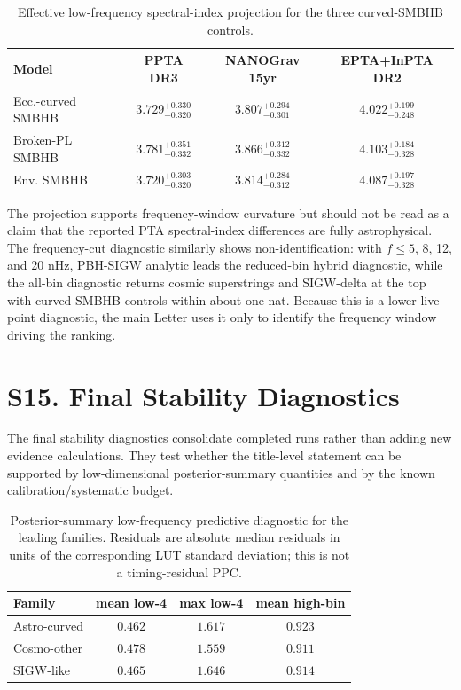 \documentclass[aps,prl,superscriptaddress,nofootinbib]{revtex4-2}
\begin{document}
\begin{table}[H]
\caption{\label{tab:gamma-bridge}Effective low-frequency spectral-index
projection for the three curved-SMBHB controls.}
\begin{ruledtabular}
\begin{tabular}{lccc}
Model & PPTA DR3 & NANOGrav 15yr & EPTA+InPTA DR2 \\
\hline
Ecc.-curved SMBHB & $3.729^{+0.330}_{-0.320}$ &
$3.807^{+0.294}_{-0.301}$ & $4.022^{+0.199}_{-0.248}$ \\
Broken-PL SMBHB & $3.781^{+0.351}_{-0.332}$ &
$3.866^{+0.312}_{-0.332}$ & $4.103^{+0.184}_{-0.328}$ \\
Env. SMBHB & $3.720^{+0.303}_{-0.320}$ &
$3.814^{+0.284}_{-0.312}$ & $4.087^{+0.197}_{-0.328}$ \\
\end{tabular}
\end{ruledtabular}
\end{table}

The projection supports frequency-window curvature but should not be read as a
claim that the reported PTA spectral-index differences are fully
astrophysical.  The frequency-cut diagnostic similarly shows
non-identification: with $f\le5$, 8, 12, and 20 nHz, PBH-SIGW analytic leads
the reduced-bin hybrid diagnostic, while the all-bin diagnostic returns cosmic
superstrings and SIGW-delta at the top with curved-SMBHB controls within
about one nat.  Because this is a lower-live-point diagnostic, the main Letter
uses it only to identify the frequency window driving the ranking.

\section*{S15. Final Stability Diagnostics}

The final stability diagnostics consolidate completed runs rather than adding
new evidence calculations.  They test whether the title-level statement can be
supported by low-dimensional posterior-summary quantities and by the known
calibration/systematic budget.

\begin{table}[H]
\caption{\label{tab:final-ppc}Posterior-summary low-frequency predictive
diagnostic for the leading families.  Residuals are absolute median residuals
in units of the corresponding LUT standard deviation; this is not a
timing-residual PPC.}
\begin{ruledtabular}
\begin{tabular}{lccc}
Family & mean low-4 & max low-4 & mean high-bin \\
\hline
Astro-curved & $0.462$ & $1.617$ & $0.923$ \\
Cosmo-other & $0.478$ & $1.559$ & $0.911$ \\
SIGW-like & $0.465$ & $1.646$ & $0.914$ \\
\end{tabular}
\end{ruledtabular}
\end{table}
\end{document}
